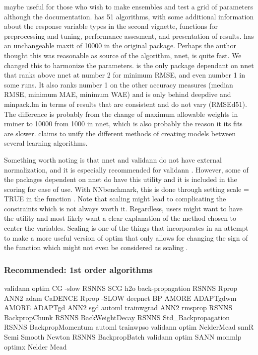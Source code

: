  \citep{R-EnsembleBase} maybe useful for those who
wish to make ensembles and test a grid of parameters although the
documentation.  \citep{R-MachineShop} has 51
algorithms, with some additional information about the response variable
types in the second vignette, functions for preprocessing and tuning,
performance assesment, and presentation of results.
 \citep{R-radiant.model} has an unchangeable
maxit of 10000 in the original package. Perhaps the author thought this
was reasonable as source of the algorithm, nnet, is quite fast. We
changed this to harmonize the parameters. 
\citep{R-rminer} is the only package dependant on nnet that ranks above
nnet at number 2 for minimum RMSE, and even number 1 in some runs. It
also ranks number 1 on the other accuracy measures (median RMSE, minimum
MAE, minimum WAE) and is only behind deepdive and minpack.lm in terms of
results that are consistent and do not vary (RMSEd51). The difference is
probably from the change of maximum allowable weights in rminer to 10000
from 1000 in nnet, which is also probably the reason it its fits are
slower.  \citep{R-traineR} claims to unify the
different methods of creating models between several learning
algorithms.

Something worth noting is that nnet and validann do not have external
normalization, and it is especially recommended for validann . However,
some of the packages dependent on nnet do have this utility and it is
included in the scoring for ease of use. With NNbenchmark, this is done
through setting scale = TRUE in the function . Note
that scaling might lead to complicating the constraints which is not
always worth it. Regardless, users might want to have the utility and
most likely want a clear explanation of the method chosen to center the
variables. Scaling is one of the things that 
\citep{R-optimx} incorporates in an attempt to make a more useful
version of optim that only allows for changing the sign of the function
which might not even be considered as scaling \citep{Nash-nlpor14}.

\hypertarget{recommended-1st-order-algorithms}{%
\subsubsection{Recommended: 1st order
algorithms}\label{recommended-1st-order-algorithms}}

validann optim CG -slow RSNNS SCG h2o back-propagation RSNNS Rprop ANN2
adam CaDENCE Rprop -SLOW deepnet BP AMORE ADAPTgdwm AMORE ADAPTgd ANN2
sgd automl trainwgrad ANN2 rmsprop RSNNS BackpropChunk RSNNS
BackWeightDecay RSNNS Std\_Backpropagation RSNNS BackpropMomentum automl
trainwpso validann optim NelderMead snnR Semi Smooth Newton RSNNS
BackpropBatch validann optim SANN monmlp optimx Nelder Mead

